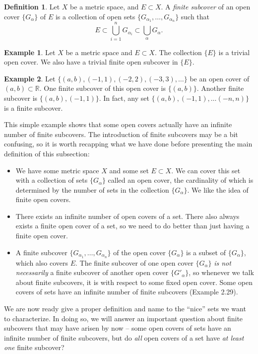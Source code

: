 \documentclass{article}
\newcommand{\R}{\mathbb{R}}
\theoremstyle{definition}
\newtheorem{definition}{Definition}[section]
\newtheorem{example}{Example}[section]
\begin{document}
\begin{definition}
Let $ X $ be a metric space, and $ E\subset X $. A \textit{\color{red}finite subcover} of an open cover $ \{G_\alpha\} $ of $ E $  is a collection of open sets $ \{G_{\alpha_1},\ldots,G_{\alpha_n}\} $ such that $$ E\subset \bigcup_{i=1}^nG_{\alpha_i}\subset\bigcup_\alpha G_\alpha. $$
\end{definition}
\begin{example}
	Let $ X $ be a metric space and $ E\subset X $. The collection $ \{E\} $ is a trivial open cover. We also have a trivial finite open subcover in $ \{E\} $. 
\end{example}
\begin{example}
	Let $ \{(a,b),(-1,1),(-2,2),(-3,3),\ldots\} $ be an open cover of $ (a,b)\subset \R $. One finite subcover of this open cover is $ \{(a,b)\} $. Another finite subcover is $ \{(a,b),(-1,1)\} $. In fact, any set $ \{(a,b),(-1,1),\ldots(-n,n)\} $ is a finite subcover. 
\end{example}
This simple example shows that some open covers actually have an infinite number of finite subcovers. The introduction of finite subcovers may be a bit confusing, so it is worth recapping what we have done before presenting the main definition of this subsection: 
\begin{itemize}
	\item We have some metric space $ X $ and some set $ E\subset X $. We can cover this set with a collection of sets $ \{G_\alpha\} $ called an open cover, the cardinality of which is determined by the number of sets in the collection $ \{G_\alpha\} $. We like the idea of finite open covers.
	\item There exists an infinite number of open covers of a set. There also always exists a finite open cover of a set, so we need to do better than just having a finite open cover.  
	\item A finite subcover $ \{G_{\alpha_1},\ldots,G_{\alpha_n}\} $ of the open cover $ \{G_\alpha\} $ is a subset of $ \{G_\alpha\} $, which also covers $ E $. The finite subcover of one open cover $ \{G_\alpha\} $ \textit{is not necessarily} a finite subcover of another open cover $ \{G'_\alpha\} $, so whenever we talk about finite subcovers, it is with respect to some fixed open cover. Some open covers of sets have an infinite number of finite subcovers (Example 2.29).
\end{itemize} 
We are now ready give a proper definition and name to the ``nice'' sets we want to characterize. In doing so, we will answer an important question about finite subcovers that may have arisen by now -- some open covers of sets have an infinite number of finite subcovers, but do \textit{all} open covers of a set have \textit{at least one} finite subcover? 
\end{document}
